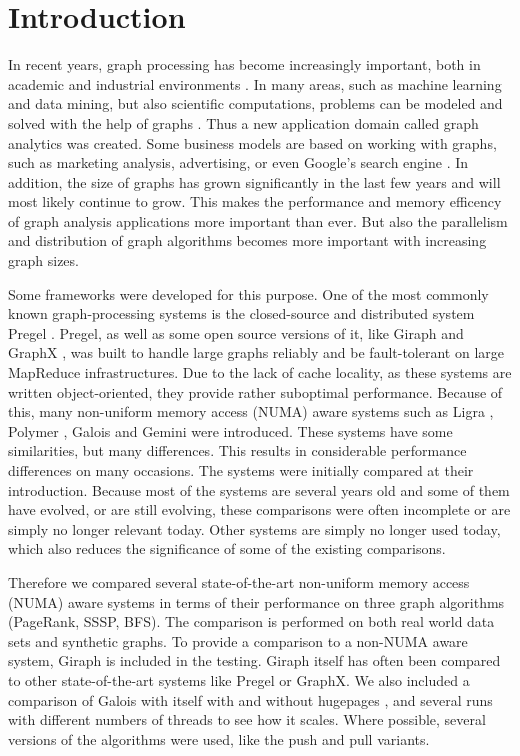 \section{Introduction}

In recent years, graph processing has become increasingly important, both in academic and industrial environments \cite{Gemini}.
In many areas, such as machine learning and data mining, but also scientific computations, problems can be modeled and solved with the help of graphs \cite{Polymer}.
Thus a new application domain called graph analytics was created.
Some business models are based on working with graphs, such as marketing analysis, advertising, or even Google's search engine \cite{pagerank}.
In addition, the size of graphs has grown significantly in the last few years and will most likely continue to grow.
This makes the performance and memory efficency of graph analysis applications more important than ever.
But also the parallelism and distribution of graph algorithms becomes more important with increasing graph sizes.

Some frameworks were developed for this purpose.
One of the most commonly known graph-processing systems is the closed-source and distributed system Pregel \cite{pregel}.
Pregel, as well as some open source versions of it, like Giraph \cite{Giraph} and GraphX \cite{graphx}, was built to handle large graphs reliably and be fault-tolerant on large MapReduce infrastructures.
Due to the lack of cache locality, as these systems are written object-oriented, they provide rather suboptimal performance.
Because of this, many non-uniform memory access (NUMA) aware systems such as Ligra \cite{Ligra}, Polymer \cite{Polymer}, Galois \cite{Galois} and Gemini \cite{Gemini} were introduced.
These systems have some similarities, but many differences. This results in considerable performance differences on many occasions.
The systems were initially compared at their introduction.
Because most of the systems are several years old and some of them have evolved, or are still evolving, these comparisons were often incomplete or are simply no longer relevant today. 
Other systems are simply no longer used today, which also reduces the significance of some of the existing comparisons.

Therefore we compared several state-of-the-art non-uniform memory access (NUMA) aware systems in terms of their performance on three graph algorithms (PageRank, SSSP, BFS).
The comparison is performed on both real world data sets and synthetic graphs.
To provide a comparison to a non-NUMA aware system, Giraph is included in the testing.
Giraph itself has often been compared to other state-of-the-art systems like Pregel or GraphX.
We also included a comparison of Galois with itself with and without hugepages \cite{hugepages}, and several runs with different numbers of threads to see how it scales.
Where possible, several versions of the algorithms were used, like the push and pull variants.

